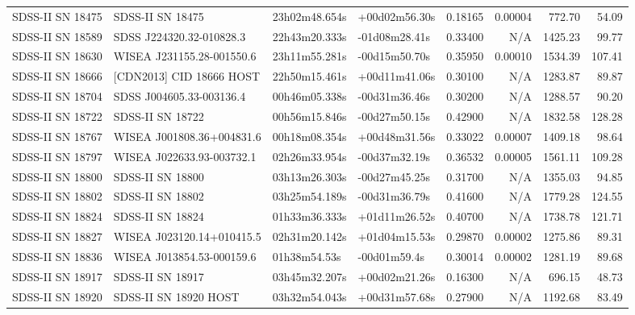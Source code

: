 \begin{longtable}{llllrrrr}
SDSS-II SN 18475 &                SDSS-II SN 18475 &   23h02m48.654s &   +00d02m56.30s &  0.18165 &  0.00004 &   772.70 &       54.09 \\
SDSS-II SN 18589 &        SDSS J224320.32-010828.3 &   22h43m20.333s &   -01d08m28.41s &  0.33400 &      N/A &  1425.23 &       99.77 \\
SDSS-II SN 18630 &       WISEA J231155.28-001550.6 &   23h11m55.281s &   -00d15m50.70s &  0.35950 &  0.00010 &  1534.39 &      107.41 \\
SDSS-II SN 18666 &        [CDN2013] CID 18666 HOST &   22h50m15.461s &   +00d11m41.06s &  0.30100 &      N/A &  1283.87 &       89.87 \\
SDSS-II SN 18704 &        SDSS J004605.33-003136.4 &   00h46m05.338s &   -00d31m36.46s &  0.30200 &      N/A &  1288.57 &       90.20 \\
SDSS-II SN 18722 &                SDSS-II SN 18722 &   00h56m15.846s &   -00d27m50.15s &  0.42900 &      N/A &  1832.58 &      128.28 \\
SDSS-II SN 18767 &       WISEA J001808.36+004831.6 &   00h18m08.354s &   +00d48m31.56s &  0.33022 &  0.00007 &  1409.18 &       98.64 \\
SDSS-II SN 18797 &       WISEA J022633.93-003732.1 &   02h26m33.954s &   -00d37m32.19s &  0.36532 &  0.00005 &  1561.11 &      109.28 \\
SDSS-II SN 18800 &                SDSS-II SN 18800 &   03h13m26.303s &   -00d27m45.25s &  0.31700 &      N/A &  1355.03 &       94.85 \\
SDSS-II SN 18802 &                SDSS-II SN 18802 &   03h25m54.189s &   -00d31m36.79s &  0.41600 &      N/A &  1779.28 &      124.55 \\
SDSS-II SN 18824 &                SDSS-II SN 18824 &   01h33m36.333s &   +01d11m26.52s &  0.40700 &      N/A &  1738.78 &      121.71 \\
SDSS-II SN 18827 &       WISEA J023120.14+010415.5 &   02h31m20.142s &   +01d04m15.53s &  0.29870 &  0.00002 &  1275.86 &       89.31 \\
SDSS-II SN 18836 &       WISEA J013854.53-000159.6 &    01h38m54.53s &    -00d01m59.4s &  0.30014 &  0.00002 &  1281.19 &       89.68 \\
SDSS-II SN 18917 &                SDSS-II SN 18917 &   03h45m32.207s &   +00d02m21.26s &  0.16300 &      N/A &   696.15 &       48.73 \\
SDSS-II SN 18920 &           SDSS-II SN 18920 HOST &   03h32m54.043s &   +00d31m57.68s &  0.27900 &      N/A &  1192.68 &       83.49 \\

\end{longtable}
